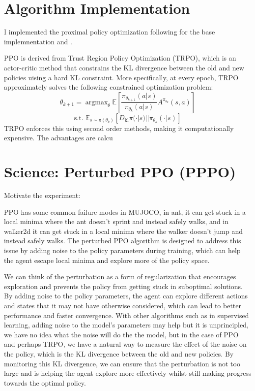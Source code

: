 \documentclass[11pt]{article}
\DeclareMathOperator{\argmax}{\text{argmax}}
\begin{document}
\section{Algorithm Implementation}

I implemented the proximal policy optimization following \cite{SpinningUp2018} for the base implemnentation and \cite{huang2022ppo}. 

PPO is derived from Trust Region Policy Optimization (TRPO), which is an actor-critic method that constrains the KL divergence between the old and new policies uising a hard KL constraint. More specifically, at every epoch, TRPO approximately solves the following constrained optimization problem:
$$\theta_{k+1} = \argmax_{\theta} \mathbb{E}\left[\frac{\pi_{\theta_{k+1}}(a|s)}{\pi_{\theta_k} (a|s)} A^{\pi_{\theta_k}}(s,a)\right]$$
$$\text{s.t. } \mathbb{E}_{s \sim \pi(\theta_k)}\left[D_{\text{kl}} \pi(\cdot | s) || \pi_{\theta_k}(\cdot | s)\right]$$
TRPO enforces this using second order methods, making it computationally expensive. The advantages are calcu




\section{Science: Perturbed PPO (PPPO)}

Motivate the experiment:

PPO has some common failure modes in MUJOCO, in ant, it can get stuck in a local minima where the ant doesn't sprint and instead safely walks, and in walker2d it can get stuck in a local minima where the walker doesn't jump and instead safely walks. The perturbed PPO algorithm is designed to address this issue by adding noise to the policy parameters during training, which can help the agent escape local minima and explore more of the policy space.

We can think of the perturbation as a form of regularization that encourages exploration and prevents the policy from getting stuck in suboptimal solutions. By adding noise to the policy parameters, the agent can explore different actions and states that it may not have otherwise considered, which can lead to better performance and faster convergence. With other algorithms such as in supervised learning, adding noise to the model's parameters may help but it is unprincipled, we have no idea what the noise will do the the model, but in the case of PPO and perhaps TRPO, we have a natural way to measure the effect of the noise on the policy, which is the KL divergence between the old and new policies. By monitoring this KL divergence, we can ensure that the perturbation is not too large and is helping the agent explore more effectively whilst still making progress towards the optimal policy.
\end{document}
